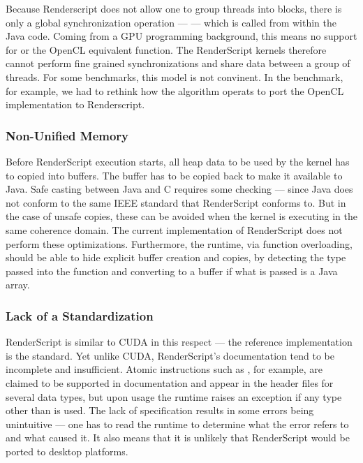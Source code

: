 Because Renderscript does not allow one to group threads into blocks, there is only a global synchronization operation
  ---  ---  which is called from within the Java code.
Coming from a GPU programming background, this means no support for  or the OpenCL
equivalent  function.
The RenderScript kernels therefore cannot perform fine grained synchronizations and share data between a group of threads.
For some benchmarks, this model is not convinent.
In the  benchmark, for example, we had to rethink how the algorithm operats to port 
  the OpenCL implementation to Renderscript.


\subsubsection{Non-Unified Memory}

Before RenderScript execution starts, all
heap data to be used by the kernel has to copied into  buffers.
The buffer has to be copied back to make it available to Java.
Safe casting between Java and C requires some checking --- since Java does not 
  conform to the same IEEE standard that RenderScript conforms to.
But in the case of unsafe copies, these can be avoided when the kernel is
  executing in the same coherence domain.
The current implementation of RenderScript does not perform these optimizations.
Furthermore, the runtime, via function overloading, should be able to hide 
  explicit buffer creation and copies, by detecting the type passed into the function
  and converting to a  buffer if what is passed is a Java array.

\subsubsection{Lack of a Standardization}

RenderScript is similar to CUDA in this respect --- the reference implementation
  is the standard.
Yet unlike CUDA, RenderScript's documentation tend to be incomplete and insufficient.
Atomic instructions such as , for example, are claimed to be supported
in documentation and appear in the header files for several data types, but upon usage 
the runtime raises an exception if any type other than  is used.
The lack of specification results in some errors being unintuitive --- one has to 
  read the runtime to determine what the error refers to and what caused it.
It also means that it is unlikely that RenderScript would be 
  ported to desktop platforms.


